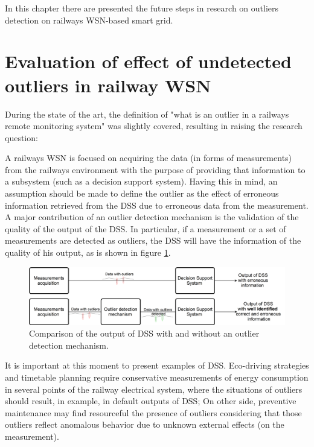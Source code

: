 In this chapter there are presented the future steps in research on outliers detection on railways WSN-based smart grid.


\section{Evaluation of effect of undetected outliers in railway WSN}


During the state of the art, the definition of "what is an outlier in a railways remote monitoring system" was slightly covered, resulting in raising the research question:
	
	
\vspace{0.5em}
{}\par
\vspace{1.5em}

A railways WSN is focused on acquiring the data (in forms of measurements) from the railways environment with the purpose of providing that information to a subsystem (such as a decision support system). Having this in mind, an assumption should be made to define the outlier as the effect of erroneous information retrieved from the DSS due to erroneous data from the measurement. A major contribution of an outlier detection mechanism is the validation of the quality of the output of the DSS. In particular, if a measurement or a set of measurements are detected as outliers, the DSS will have the information of the quality of his output, as is shown in figure \ref{fig:evaluation}.

\begin{figure}[h!]
	\centering
	\includegraphics[width=1.03\textwidth,keepaspectratio]{figures/evaluation}
	\caption{Comparison of the output of DSS with and without an outlier detection mechanism. }
	\label{fig:evaluation}
\end{figure}

It is important at this moment to present examples of DSS. Eco-driving strategies and timetable planning require conservative measurements of energy consumption in several points of the railway electrical system, where the situations of outliers should result, in example, in default outputs of DSS; On other side, preventive maintenance may find resourceful the presence of outliers considering that those outliers reflect anomalous behavior due to unknown external effects (on the measurement).

